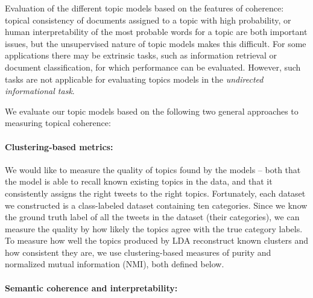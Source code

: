 \documentclass[10pt,a5paper,twoside]{article}
\begin{document}
\label{sec:evaluation}

Evaluation of the different topic models based on the features of
coherence: topical consistency of documents assigned to a topic with
high probability, or human interpretability of the most probable words
for a topic are both important issues, but the unsupervised nature of
topic models makes this difficult. For some applications there may be
extrinsic tasks, such as information retrieval or document
classification, for which performance can be evaluated. However, such
tasks are not applicable for evaluating topics models in the {\it
  undirected informational task}.

We evaluate our topic models based on the following two general
approaches to measuring topical coherence:

\paragraph{Clustering-based metrics:} 

We would like to measure the quality of topics found by the models --
both that the model is able to recall known existing topics in the
data, and that it consistently assigns the right tweets to the right
topics.  Fortunately, each dataset we constructed is a class-labeled
dataset containing ten categories. Since we know the ground truth
label of all the tweets in the dataset (their categories), we can
measure the quality by how likely the topics agree with the true
category labels. To measure how well the topics produced by LDA
reconstruct known clusters and how consistent they are, we use
clustering-based measures of purity and normalized mutual information
(NMI), both defined below.

\paragraph{Semantic coherence and interpretability:}
\end{document}
